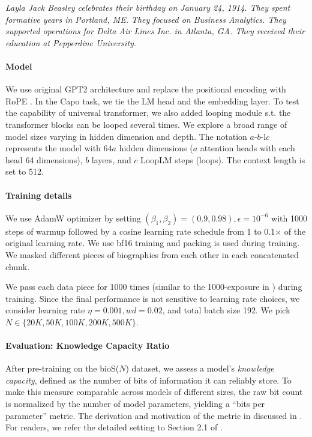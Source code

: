 \documentclass[]{bytedance_seed}
\newcommand{\1}{\mathbf{1}}
\newcommand{\ut}{LoopLM}
\begin{document}
{\begin{center}
    \emph{Layla Jack Beasley celebrates their birthday on January 24, 1914. They spent formative years in Portland, ME. They focused on Business Analytics. They supported operations for Delta Air Lines Inc. in Atlanta, GA. They received their education at Pepperdine University.}
\end{center}

\paragraph{Model} We use original GPT2 architecture and replace the positional encoding with RoPE \cite{su2023roformerenhancedtransformerrotary}. In the Capo task, we tie the LM head and the embedding layer. To test the capability of universal transformer, we also added looping module s.t. the transformer blocks can be looped several times. We explore a broad range of model sizes varying in hidden dimension and depth. The notation $a$-$b$-l$c$ represents the model with $64a$ hidden dimensions ($a$ attention heads with each head 64 dimensions), $b$ layers, and $c$ \ut{} steps (loops). The context length is set to 512. 

\paragraph{Training details} We use AdamW optimizer by setting $(\beta_1,\beta_2)=(0.9,0.98), \epsilon=10^{-6}$ with 1000 steps of warmup followed by a cosine learning rate schedule from 1 to 0.1$\times$ of the original learning rate. We use bf16 training and packing is used during training. We masked different pieces of biographies from each other in each concatenated chunk.

We pass each data piece for 1000 times (similar to the 1000-exposure in \cite{AL2024-knowledge3}) during training. Since the final performance is not sensitive to learning rate choices, we consider learning rate $\eta = 0.001, wd=0.02$, and total batch size 192. We pick $N\in\{20K, 50K, 100K, 200K, 500K\}$. 

\paragraph{Evaluation: Knowledge Capacity Ratio} 
After pre-training on the bioS($N$) dataset, we assess a model’s \emph{knowledge capacity}, 
defined as the number of bits of information it can reliably store. To make this measure 
comparable across models of different sizes, the raw bit count is normalized by the number 
of model parameters, yielding a ``bits per parameter'' metric. 
The derivation and motivation of the metric in discussed in \cite{AL2024-knowledge3}. For readers, we refer the detailed setting to Section 2.1 of \cite{AL2024-knowledge3}.

}
\end{document}
